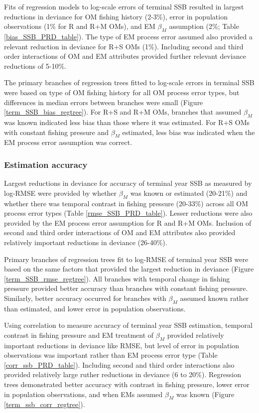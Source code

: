 \documentclass[
  12pt,
]{article}
\begin{document}
Fits of regression models to log-scale errors of terminal SSB resulted in largest reductions in deviance for OM fishing history (2-3\%), error in population observations (1\% for R and R+M OMs), and EM \(\beta_M\) assumption (2\%; Table \ref{bias_SSB_PRD_table}). The type of EM process error assumed also provided a relevant reduction in deviance for R+S OMs (1\%). Including second and third order interactions of OM and EM attributes provided further relevant deviance reductions of 5-10\%.

The primary branches of regression trees fitted to log-scale errors in terminal SSB were based on type of OM fishing history for all OM process error types, but differences in median errors between branches were small (Figure \ref{term_SSB_bias_regtree}). For R+S and R+M OMs, branches that assumed \(\beta_M\) was known indicated less bias than those where it was estimated. For R+S OMs with constant fishing pressure and \(\beta_M\) estimated, less bias was indicated when the EM process error assumption was correct.

\subsubsection*{Estimation accuracy}\label{estimation-accuracy-1}

Largest reductions in deviance for accuracy of terminal year SSB as measured by log-RMSE were provided by whether \(\beta_M\) was known or estimated (20-21\%) and whether there was temporal contrast in fishing pressure (20-33\%) across all OM process error types (Table \ref{rmse_SSB_PRD_table}). Lesser reductions were also provided by the EM process error assumption for R and R+M OMs. Inclusion of second and third order interactions of OM and EM attributes also provided relatively important reductions in deviance (26-40\%).

Primary branches of regression trees fit to log-RMSE of terminal year SSB were based on the same factors that provided the largest reduction in deviance (Figure \ref{term_SSB_rmse_regtree}). All branches with temporal change in fishing pressure provided better accuracy than branches with constant fishing pressure. Similarly, better accuracy occurred for branches with
\(\beta_M\) assumed known rather than estimated, and lower error in population observations.

Using correlation to measure accuracy of terminal year SSB estimation, temporal contrast in fishing pressure and EM treatment of \(\beta_M\) provided relatively important reductions in deviance like RMSE, but level of error in population observations was important rather than EM process error type (Table \ref{corr_ssb_PRD_table}). Including second and third order interactions also provided relatively large ruther reductions in deviance (6 to 20\%). Regression trees demonstrated better accuracy with contrast in fishing pressure, lower error in population observations, and when EMs assumed \(\beta_M\) was known (Figure \ref{term_ssb_corr_regtree}).
\end{document}
